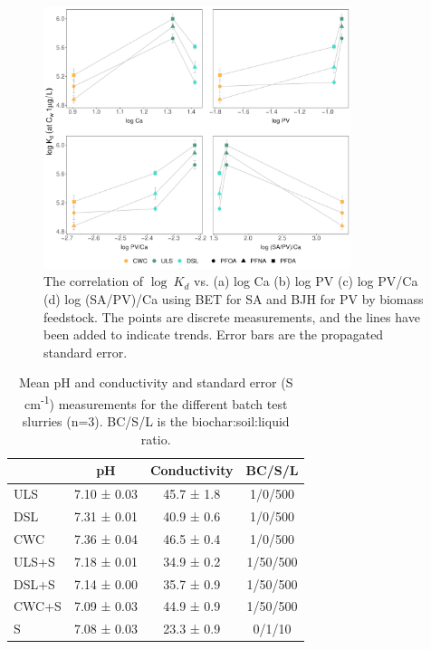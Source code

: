 \begin{figure}[htb]
    \centering
    \includegraphics[width=0.8\textwidth]{R/figs/Correlation_SAPV_Ca_plot.pdf}
    \caption{The correlation of $\log~K_d$ vs. (a) log Ca (b) log PV (c) log PV/Ca (d) log (SA/PV)/Ca using BET for SA and BJH for PV by biomass feedstock. The points are discrete measurements, and the lines have been added to indicate trends. Error bars are the propagated standard error.}
    \label{fig:Kd_SAPV_Ca}
\end{figure}

\begin{table}
\centering
\caption{Mean pH and conductivity and standard error (\textmu S cm\textsuperscript{-1}) measurements for the different batch test slurries (n=3). BC/S/L is the biochar:soil:liquid ratio.}
\label{tab:pHcond}
\begin{tabular}{lccc}
\toprule
 & \multicolumn{1}{c}{pH} & \multicolumn{1}{c}{Conductivity} & BC/S/L\\ \midrule
ULS   & 7.10 ± 0.03 & 45.7 ± 1.8 & 1/0/500\\
DSL   & 7.31 ± 0.01 & 40.9 ± 0.6 & 1/0/500\\
CWC   & 7.36 ± 0.04 & 46.5 ± 0.4 & 1/0/500\\
ULS+S & 7.18 ± 0.01 & 34.9 ± 0.2 & 1/50/500\\
DSL+S & 7.14 ± 0.00 & 35.7 ± 0.9 & 1/50/500\\
CWC+S & 7.09 ± 0.03 & 44.9 ± 0.9 & 1/50/500\\
S     & 7.08 ± 0.03 & 23.3 ± 0.9 & 0/1/10\\
\bottomrule
\end{tabular}
\end{table}

